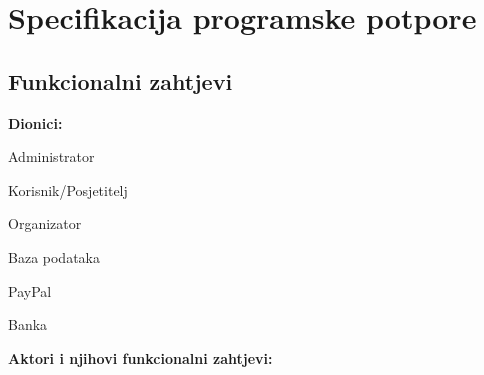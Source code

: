 \chapter{Specifikacija programske potpore}
		
	\section{Funkcionalni zahtjevi}

			
			\noindent \textbf{Dionici:}
			
			\begin{packed_enum}
				
				\item Administrator
				\item Korisnik/Posjetitelj				
				\item Organizator				
				\item Baza podataka
				\item PayPal
				\item Banka
				
				
			\end{packed_enum}
			
			\noindent \textbf{Aktori i njihovi funkcionalni zahtjevi:}
			

